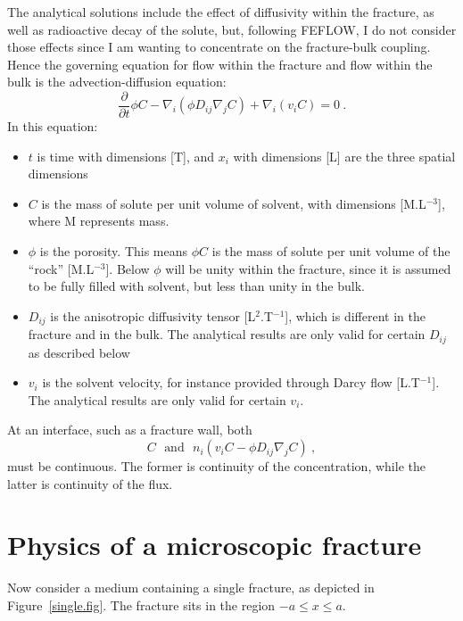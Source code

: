 \documentclass[]{scrreprt}
\begin{document}
The analytical solutions include the effect of diffusivity within the
fracture, as well as radioactive decay of the solute, but, following
FEFLOW, I do not consider those effects since I am wanting to
concentrate on the fracture-bulk coupling.  Hence the governing
equation for flow within the fracture and flow within the bulk is the
advection-diffusion equation:
\begin{equation}
\frac{\partial}{\partial t} \phi C - \nabla_{i}\left(\phi D_{ij}\nabla_{j}C\right)
+ \nabla_{i}\left(v_{i}C\right) = 0 \ .
\label{eqn.solute.de}
\end{equation}
In this equation:
\begin{itemize}
\item $t$ is time with dimensions [T], and $x_{i}$ with dimensions
  [L] are the three spatial dimensions
\item $C$ is the mass of solute per unit volume of solvent, with
  dimensions [M.L$^{-3}$], where M represents mass.
\item $\phi$ is the porosity.  This means $\phi C$ is the mass of
  solute per unit volume of the ``rock'' [M.L$^{-3}$].  Below $\phi$ will
  be unity within the fracture, since it is assumed to be fully filled
  with solvent, but less than unity in the bulk.
\item $D_{ij}$ is the anisotropic diffusivity tensor
  [L$^{2}$.T$^{-1}$], which is different in the fracture and in the bulk.  The analytical 
  results are only valid for certain $D_{ij}$ as described below
\item $v_{i}$ is the solvent velocity, for instance provided through
  Darcy flow [L.T$^{-1}$].  The analytical results are only valid for certain
  $v_{i}$.
\end{itemize}
At an interface, such as a fracture wall, both
\begin{equation}
C \ \ \ \mbox{and}\ \ \ n_{i}(v_{i}C - \phi D_{ij}\nabla_{j}C) \ ,
\end{equation}
must be continuous.  The former is continuity of the concentration,
while the latter is continuity of the flux.


\section{Physics of a microscopic fracture}

Now consider a medium containing a single fracture, as depicted in
Figure~\ref{single.fig}.  The fracture sits in the region
$-a\leq x \leq a$.
\end{document}
